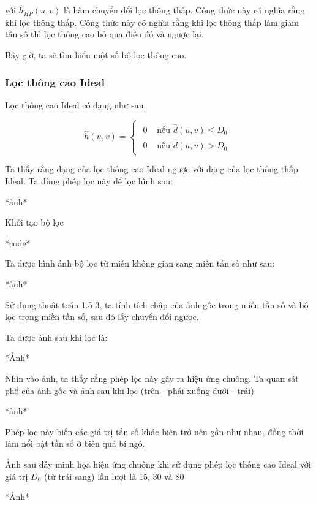 \documentclass[12pt,a4paper]{report}
\numberwithin{equation}{section}
\theoremstyle{definition} %
\begin{document}
với $\hat{h}_{HP}(u,v)$ là hàm chuyển đổi lọc thông thấp. Công thức này có nghĩa rằng khi lọc thông thấp. Công thức này có nghĩa rằng khi lọc thông thấp làm giảm tần số thì lọc thông cao bỏ qua điều đó và ngược lại.

Bây giờ, ta sẽ tìm hiểu một số bộ lọc thông cao.

\subsubsection{Lọc thông cao Ideal}

Lọc thông cao Ideal có dạng như sau:

\begin{equation}
    \hat{h}(u,v)=\begin{cases}
    \begin{aligned}
        0& \text{ nếu }  \hat{d}(u,v) \le D_0\\
        0& \text{ nếu }  \hat{d}(u,v) > D_0
    \end{aligned}
\end{cases}
\end{equation}


Ta thấy rằng dạng của lọc thông cao Ideal ngược với dạng của lọc thông thấp Ideal. Ta dùng phép lọc này để lọc hình sau: 

*ảnh*

Khởi tạo bộ lọc 

*code*

Ta được hình ảnh bộ lọc từ miền không gian sang miền tần số như sau:

*ảnh*

Sử dụng thuật toán 1.5-3, ta tính tích chập của ảnh gốc trong miền tần số và bộ lọc trong miền tần số, sau đó lấy chuyển đổi ngược.

Ta được ảnh sau khi lọc là:

*Ảnh*

Nhìn vào ảnh, ta thấy rằng phép lọc này gây ra hiệu ứng chuông. Ta quan sát phổ của ảnh gốc và ảnh sau khi lọc (trên - phải xuống dưới - trái)

*ảnh*

Phép lọc này biến các giá trị tần số khác biên trở nên gần như nhau, đồng thời làm nổi bật tần số ở biên quả bí ngô.

Ảnh sau đây minh họa hiệu ứng chuông khi sử dụng phép lọc thông cao Ideal với giá trị $D_0$ (từ trái sang) lần lượt là 15, 30 và 80

*Ảnh*
\end{document}
